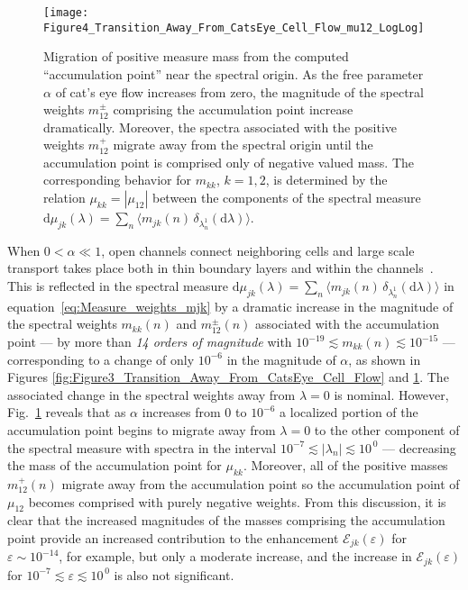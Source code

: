 \documentclass[english,12pt,jmp,graphicx]{revtex4-1}
\newcommand{\figref}[1]{Fig.~\ref{#1}}
\newcommand{\numfigref}[1]{\ref{#1}}
\renewcommand{\d}{\mathrm{d}}
\begin{document}
%
\begin{figure}[t]
  \centerline{\texttt{[image: Figure4\_Transition\_Away\_From\_CatsEye\_Cell\_Flow\_mu12\_LogLog]}} 
\caption{%
  Migration of positive measure mass from the computed ``accumulation point''
  near the spectral origin. As the free parameter $\alpha$ of cat's
  eye flow increases from zero, the magnitude of the spectral weights 
  $m_{12}^\pm$ comprising the accumulation point increase
  dramatically. Moreover, the spectra associated with the positive 
  weights $m_{12}^+$ migrate away from the spectral origin until the
  accumulation point is comprised only of negative valued mass. The
  corresponding behavior for $m_{kk}$, $k=1,2$, is determined by the
  relation $\mu_{kk}=|\mu_{12}|$ between the components of the
  spectral measure $\d\mu_{jk}(\lambda)=\sum_n\langle
  m_{jk}(n)\,\delta_{\lambda^1_n}(\d\lambda)\rangle$.   
        }
\label{fig:Figure6_CatsEye_Cell_Flow_mu12_LogLog}
\end{figure}
%




When  $0<\alpha\ll1$, open channels connect neighboring cells and
large scale transport takes place both in thin boundary layers and
within the channels~\cite{Fannjiang:1994:SIAM_JAM:333}. This is
reflected in the spectral measure
$\d\mu_{jk}(\lambda)=\sum_n\langle
m_{jk}(n)\,\delta_{\lambda^1_n}(\d\lambda)\rangle$ in 
equation~\eqref{eq:Measure_weights_mjk} by a dramatic 
increase in the magnitude of the 
spectral weights $m_{kk}(n)$ and $m^\pm_{12}(n)$ associated with the
accumulation point  --- by more than \emph{14 orders of magnitude}
with $10^{-19}\lesssim m_{kk}(n)\lesssim10^{-15}$ ---
corresponding to a change of only $10^{-6}$ in the magnitude of
$\alpha$, as shown in Figures
\numfigref{fig:Figure3_Transition_Away_From_CatsEye_Cell_Flow} and
\numfigref{fig:Figure6_CatsEye_Cell_Flow_mu12_LogLog}. The 
associated change in the spectral weights away from $\lambda=0$ is
nominal. However, \figref{fig:Figure6_CatsEye_Cell_Flow_mu12_LogLog} 
reveals that as $\alpha$ increases from $0$
to $10^{-6}$ a localized portion of the accumulation point begins to migrate
away from $\lambda=0$ to the
other component of the spectral measure with spectra in the interval
$10^{-7}\lesssim|\lambda_n|\lesssim10^{\,0}$ --- decreasing the mass of
the accumulation point for $\mu_{kk}$. Moreover, all of the positive masses
$m^+_{12}(n)$ migrate away from the accumulation 
point so the accumulation point of $\mu_{12}$ becomes comprised with  purely
negative weights.  From this discussion, it
is clear that the increased magnitudes of the masses comprising the accumulation
point provide an increased contribution to the enhancement 
$\mathcal{E}_{jk}(\varepsilon)$ for $\varepsilon\sim10^{-14}$, for
example, but only a moderate increase, and the increase in
$\mathcal{E}_{jk}(\varepsilon)$ for
$10^{-7}\lesssim\varepsilon\lesssim10^{\,0}$ is also not significant.  
\end{document}
